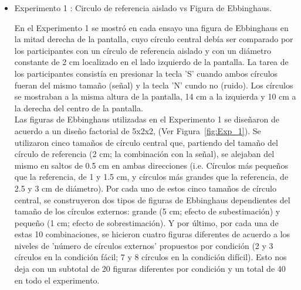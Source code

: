 \begin{itemize}
\item Experimento 1 : Circulo de referencia aislado vs Figura de Ebbinghaus.

En el Experimento 1 se mostró en cada ensayo una figura de Ebbinghaus en la mitad derecha de la pantalla, cuyo círculo central debía ser comparado por los participantes con un círculo de referencia aislado y con un diámetro constante de 2 cm localizado en el lado izquierdo de la pantalla. La tarea de los participantes consistía en presionar la tecla 'S' cuando ambos círculos fueran del mismo tamaño (señal) y la tecla 'N'  cundo no (ruido). Los círculos se mostraban a la misma altura de la pantalla, 14 cm a la izquierda y 10 cm a la derecha del centro de la pantalla.\\

Las figuras de Ebbinghaus utilizadas en el Experimento 1 se diseñaron de acuerdo a un diseño factorial de 5x2x2, (Ver Figura~\ref{fig:Exp_1}). Se utilizaron cinco tamaños de círculo central que, partiendo del tamaño del círculo de referencia (2 cm; la combinación con la señal), se alejaban del mismo en saltos de 0.5 cm en ambas direcciones (i.e. Círculos más pequeños que la referencia, de 1 y 1.5 cm, y círculos más grandes que la referencia, de 2.5 y 3 cm de diámetro). Por cada uno de estos cinco tamaños de círculo central, se construyeron dos tipos de figuras de Ebbinghaus dependientes del tamaño de los círculos externos: grande (5 cm; efecto de subestimación) y pequeño (1 cm; efecto de sobrestimación). Y por último, por cada una de estas 10 combinaciones, se hicieron cuatro figuras diferentes de acuerdo a los niveles de 'número de círculos externos' propuestos por condición (2 y 3 círculos en la condición fácil; 7 y 8 círculos en la condición difícil). Esto nos deja con un subtotal de 20 figuras diferentes por condición y un total de 40 en todo el experimento.\\
 

\end{itemize}
